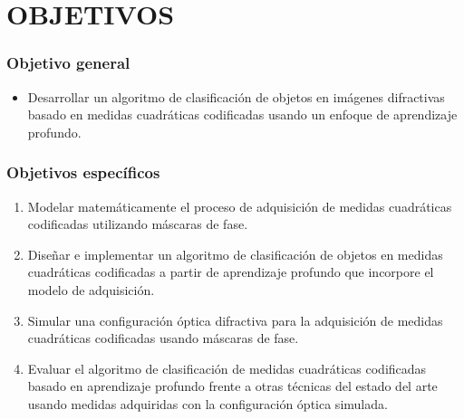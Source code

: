 
\chapter{OBJETIVOS}

\subsection*{Objetivo general}

\begin{itemize}
   \item Desarrollar un algoritmo de clasificación de objetos en imágenes difractivas basado en medidas cuadráticas codificadas usando un enfoque de aprendizaje profundo.
\end{itemize}

\subsection*{Objetivos específicos}


\begin{enumerate}

    \item Modelar matemáticamente el proceso de adquisición de medidas cuadráticas codificadas utilizando máscaras de fase.

    \item Diseñar e implementar un algoritmo de clasificación de objetos en medidas cuadráticas codificadas a partir de aprendizaje profundo que incorpore el modelo de adquisición.
    
    \item Simular una configuración óptica difractiva para la adquisición de medidas cuadráticas codificadas usando máscaras de fase.
    
    \item Evaluar el algoritmo de clasificación de medidas cuadráticas codificadas basado en aprendizaje profundo frente a otras técnicas del estado del arte usando medidas adquiridas con la configuración óptica simulada.

\end{enumerate}
\pagebreak


